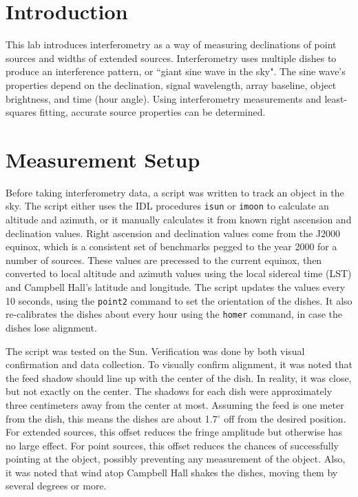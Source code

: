 \documentclass[12pt]{article}
\newcommand{\degree}{\ensuremath{^\circ} }
\begin{document}
\maketitle

\section{Introduction}
This lab introduces interferometry as a way of measuring declinations of point sources and widths of extended sources.
Interferometry uses multiple dishes to produce an interference pattern, or ``giant sine wave in the sky".
The sine wave's properties depend on the declination, signal wavelength, array baseline, object brightness, and time (hour angle).
Using interferometry measurements and least-squares fitting, accurate source properties can be determined.



\section{Measurement Setup}
Before taking interferometry data, a script was written to track an object in the sky.
The script either uses the IDL procedures \texttt{isun} or \texttt{imoon} to calculate an altitude and azimuth, or it manually calculates it from known right ascension and declination values.
Right ascension and declination values come from the J2000 equinox, which is a consistent set of benchmarks pegged to the year 2000 for a number of sources.
These values are precessed to the current equinox, then converted to local altitude and azimuth values using the local sidereal time (LST) and Campbell Hall's latitude and longitude.
The script updates the values every 10 seconds, using the \texttt{point2} command to set the orientation of the dishes.
It also re-calibrates the dishes about every hour using the \texttt{homer} command, in case the dishes lose alignment.

The script was tested on the Sun.
Verification was done by both visual confirmation and data collection.
To visually confirm alignment, it was noted that the feed shadow should line up with the center of the dish.
In reality, it was close, but not exactly on the center.
The shadows for each dish were approximately three centimeters away from the center at most.
Assuming the feed is one meter from the dish, this means the dishes are about 1.7\degree off from the desired position.
For extended sources, this offset reduces the fringe amplitude but otherwise has no large effect.
For point sources, this offset reduces the chances of successfully pointing at the object, possibly preventing any measurement of the object.
Also, it was noted that wind atop Campbell Hall shakes the dishes, moving them by several degrees or more.
\end{document}

